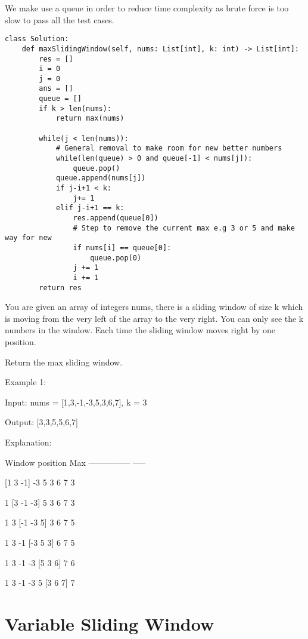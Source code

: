 \documentclass[a4]{article}
\begin{document}
We make use a queue in order to reduce time complexity as brute force is too slow to pass all the test cases.

\begin{lstlisting}
class Solution:
    def maxSlidingWindow(self, nums: List[int], k: int) -> List[int]:
        res = []
        i = 0
        j = 0
        ans = []
        queue = []
        if k > len(nums):
            return max(nums)
        
        while(j < len(nums)):
            # General removal to make room for new better numbers
            while(len(queue) > 0 and queue[-1] < nums[j]):
                queue.pop()
            queue.append(nums[j])
            if j-i+1 < k:
                j+= 1
            elif j-i+1 == k:
                res.append(queue[0])
                # Step to remove the current max e.g 3 or 5 and make way for new
                if nums[i] == queue[0]:
                    queue.pop(0)
                j += 1
                i += 1  
        return res
\end{lstlisting}

You are given an array of integers nums, there is a sliding window of size k which is moving from the very left of the array to the very right. You can only see the k numbers in the window. Each time the sliding window moves right by one position.

Return the max sliding window.

Example 1:

Input: nums = [1,3,-1,-3,5,3,6,7], k = 3

Output: [3,3,5,5,6,7]

Explanation: 

Window position                Max
---------------               -----

[1  3  -1] -3  5  3  6  7       3

 1 [3  -1  -3] 5  3  6  7       3

 1  3 [-1  -3  5] 3  6  7       5

 1  3  -1 [-3  5  3] 6  7       5

 1  3  -1  -3 [5  3  6] 7       6

 1  3  -1  -3  5 [3  6  7]      7

 \newpage
 \section{Variable Sliding Window}
\begin{lstlisting}

\end{lstlisting}
\end{document}
